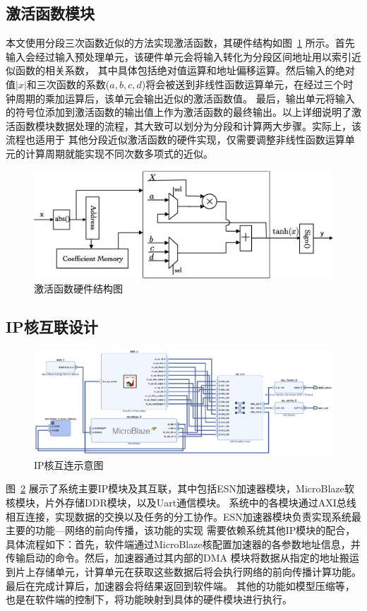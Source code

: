 \subsection{激活函数模块}
本文使用分段三次函数近似的方法实现激活函数，其硬件结构如图~\ref{fig:tanh} 所示。首先输入会经过输入预处理单元，该硬件单元会将输入转化为分段区间地址用以索引近似函数的相关系数，
其中具体包括绝对值运算和地址偏移运算。然后输入的绝对值\(|x|\)和三次函数的系数(\(a,b,c,d\))将会被送到非线性函数运算单元，在经过三个时钟周期的乘加运算后，该单元会输出近似的激活函数值。
最后，输出单元将输入的符号位添加到激活函数的输出值上作为激活函数的最终输出。以上详细说明了激活函数模块数据处理的流程，其大致可以划分为分段和计算两大步骤。实际上，该流程也适用于
其他分段近似激活函数的硬件实现，仅需要调整非线性函数运算单元的计算周期就能实现不同次数多项式的近似。
\begin{figure}[htbp]
	\centering
	\includegraphics[width=1\columnwidth]{exp/fig_activation_hard.eps}
	\caption{激活函数硬件结构图}
	\label{fig:tanh}
\end{figure}
\subsection{IP核互联设计}
\begin{figure}[htbp]
	\centering
	\includegraphics[width=1\columnwidth]{exp/fig_blockDesign.eps}
	\caption{IP核互连示意图}
	\label{fig:blockDesign}
\end{figure}
图~\ref{fig:blockDesign} 展示了系统主要IP模块及其互联，其中包括ESN加速器模块，MicroBlaze软核模块，片外存储DDR模块，以及Uart通信模块。
系统中的各模块通过AXI总线相互连接，实现数据的交换以及任务的分工协作。ESN加速器模块负责实现系统最主要的功能---网络的前向传播，该功能的实现
需要依赖系统其他IP模块的配合，具体流程如下：首先，软件端通过MicroBlaze核配置加速器的各参数地址信息，并传输启动的命令。然后，加速器通过其内部的DMA
模块将数据从指定的地址搬运到片上存储单元，计算单元在获取这些数据后将会执行网络的前向传播计算功能。最后在完成计算后，加速器会将结果返回到软件端。
其他的功能如模型压缩等，也是在软件端的控制下，将功能映射到具体的硬件模块进行执行。


